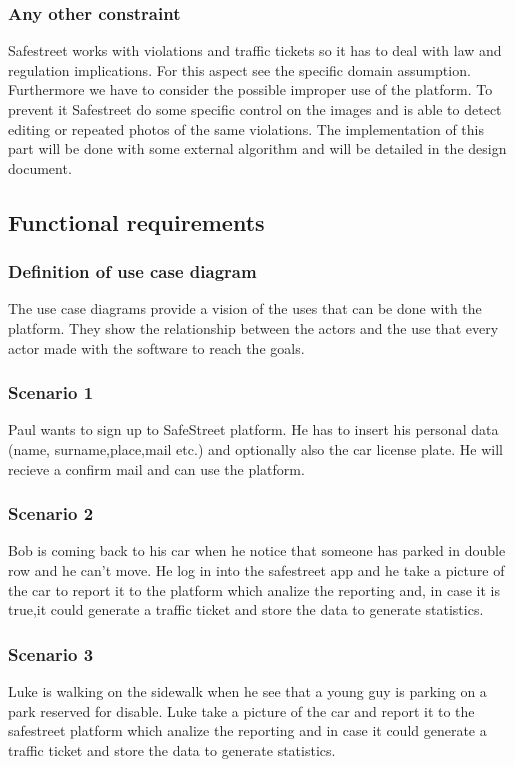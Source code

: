 \subsubsection{Any other constraint}
Safestreet works with violations and traffic tickets so it has to deal with law and regulation implications.
For this aspect see the specific domain assumption. 
Furthermore we have to consider the possible improper use of the platform. To prevent it Safestreet do some specific control on the images and is able to detect editing or repeated photos of the same violations. The implementation of this part will be done with some external algorithm and will be detailed in the design document.

\subsection{Functional requirements}
\subsubsection{Definition of use case diagram}
The use case diagrams provide a vision of the uses that can be done with the platform. They show the relationship between the actors and the use that every actor made with the software to reach the goals.

\subsubsection{Scenario 1}
Paul wants to sign up to SafeStreet platform. He has to insert his personal data (name, surname,place,mail etc.) and optionally also the car license plate. He will recieve a confirm mail and can use the platform.
\subsubsection{Scenario 2}
Bob is coming back to his car when he notice that someone has parked in double row and he can’t move. He log in into the safestreet app and he take a picture of the car to report it to the platform which analize the reporting and, in case it is true,it  could generate a traffic ticket and store the data to generate statistics.

\subsubsection{Scenario 3}
Luke is walking on the sidewalk when he see that a young guy is parking on a park reserved for disable.
Luke take a picture of the car and report it to the safestreet platform which analize the reporting and in case it could generate a traffic ticket and store the data to generate statistics.

